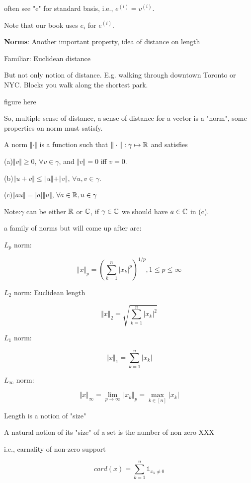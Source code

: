 often see "e" for standard basis, i.e., $e^{(i)}=v^{(i)}$.

Note that our book uses $e_{i}$ for $e^{(i)}$.

\vspace{0.5cm}
\noindent\textbf{Norms}: Another important property, idea of distance on length

Familiar: Euclidean distance 

But not only notion of distance. E.g. walking through downtown Toronto or NYC. Blocks you walk along the shortest park.

figure here

So, multiple sense of distance, a sense of distance for a vector is a "norm", some properties on norm must satisfy.

A norm $\Vert\cdot\Vert$ is a function such that $\Vert\cdot\Vert : \gamma\mapsto\mathbb{R}$
and satisfies

(a)$\Vert v \Vert\geq 0$, $\forall v\in \gamma$, and $\Vert v \Vert=0$ iff $v=0$.

(b)$\Vert u+v \Vert\leq \Vert u \Vert+\Vert v \Vert$, $\forall u, v\in \gamma$.

(c)$\Vert au \Vert= \vert a\vert\Vert u \Vert$, $\forall a\in\mathbb{R}, u\in\gamma$

Note:$\gamma$ can be either $\mathbb{R}$ or $\mathbb{C}$, if $\gamma\in\mathbb{C}$ we should have $a\in\mathbb{C}$ in (c).

a family of norms but will come up after are:

$L_{p}$ norm:

$$\Vert x\Vert_{p}=(\sum_{k=1}^{n}\vert x_{k}\vert^{p})^{1/p}, 1\leq p\leq\infty$$

$L_{2}$ norm: Euclidean length

$$\Vert x\Vert_{2}=\sqrt{\sum_{k=1}^{n}\vert x_{k}\vert^{2}}$$

$L_{1}$ norm:

$$\Vert x\Vert_{1}=\sum_{k=1}^{n}\vert x_{k}\vert$$

$L_{\infty}$ norm:

$$\Vert x\Vert_{\infty}=\lim_{p\to\infty}\Vert x_{k}\Vert_{p}=\max_{k\in [n]} \vert x_{k}\vert$$


Length is a notion of "size"

A natural notion of its "size" of a set is the number of non zero XXX

i.e., carnality of non-zero support

$$card(x)=\sum_{k=1}^{n}\mathbb{1}_{x_{k}\neq 0}$$

